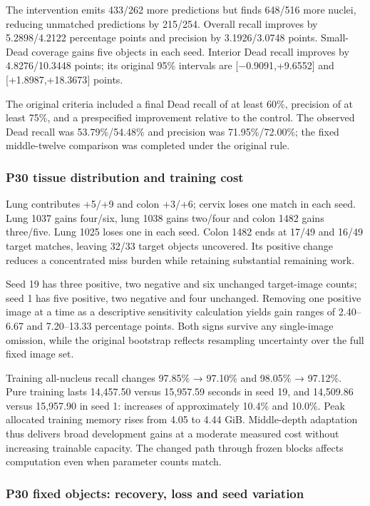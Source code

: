 \documentclass[
  11pt,
]{article}
\begin{document}
The intervention emits 433/262 more predictions but finds 648/516 more
nuclei, reducing unmatched predictions by 215/254. Overall recall
improves by 5.2898/4.2122 percentage points and precision by
3.1926/3.0748 points. Small-Dead coverage gains five objects in each
seed. Interior Dead recall improves by 4.8276/10.3448 points; its
original 95\% intervals are {[}−0.9091,+9.6552{]} and
{[}+1.8987,+18.3673{]} points.

The original criteria included a final Dead recall of at least 60\%,
precision of at least 75\%, and a prespecified improvement relative to
the control. The observed Dead recall was 53.79\%/54.48\% and precision
was 71.95\%/72.00\%; the fixed middle-twelve comparison was completed
under the original rule.

\subsubsection{P30 tissue distribution and training
cost}\label{p30-tissue-distribution-and-training-cost}

Lung contributes +5/+9 and colon +3/+6; cervix loses one match in each
seed. Lung 1037 gains four/six, lung 1038 gains two/four and colon 1482
gains three/five. Lung 1025 loses one in each seed. Colon 1482 ends at
17/49 and 16/49 target matches, leaving 32/33 target objects uncovered.
Its positive change reduces a concentrated miss burden while retaining
substantial remaining work.

Seed 19 has three positive, two negative and six unchanged target-image
counts; seed 1 has five positive, two negative and four unchanged.
Removing one positive image at a time as a descriptive sensitivity
calculation yields gain ranges of 2.40--6.67 and 7.20--13.33 percentage
points. Both signs survive any single-image omission, while the original
bootstrap reflects resampling uncertainty over the full fixed image set.

Training all-nucleus recall changes 97.85\% → 97.10\% and 98.05\% →
97.12\%. Pure training lasts 14,457.50 versus 15,957.59 seconds in seed
19, and 14,509.86 versus 15,957.90 in seed 1: increases of approximately
10.4\% and 10.0\%. Peak allocated training memory rises from 4.05 to
4.44 GiB. Middle-depth adaptation thus delivers broad development gains
at a moderate measured cost without increasing trainable capacity. The
changed path through frozen blocks affects computation even when
parameter counts match.

\subsubsection{P30 fixed objects: recovery, loss and seed
variation}\label{p30-fixed-objects-recovery-loss-and-seed-variation}
\end{document}
